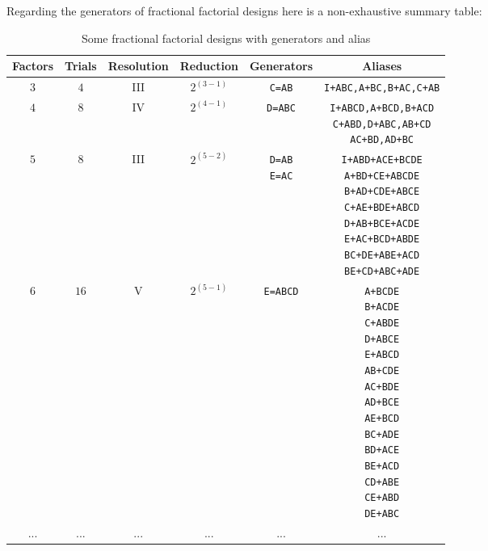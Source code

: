 	Regarding the generators of fractional factorial designs here is a non-exhaustive summary table:
	\begin{table}[H]\centering
	\begin{center}
			\begin{tabular}{|c|c|c|c|c|c|}
				\hline
				\multicolumn{1}{c}{\cellcolor{black!30}\textbf{Factors}} & 
  \multicolumn{1}{c}{\cellcolor{black!30}\textbf{Trials}} & 
  \multicolumn{1}{c}{\cellcolor{black!30}\textbf{Resolution}} & 
  \multicolumn{1}{c}{\cellcolor{black!30}\textbf{Reduction}} & 
  \multicolumn{1}{c}{\cellcolor{black!30}\textbf{Generators}} & 
  \multicolumn{1}{c}{\cellcolor{black!30}\textbf{Aliases}}\\ \hline
				 $3$ & $4$ & III & $2^{(3-1)}$ & \texttt{C=AB} & \parbox{4.5cm}{\texttt{I+ABC,A+BC,B+AC,C+AB}} \\ \hline
				 $4$ & $8$ & IV & $2^{(4-1)}$ & \texttt{D=ABC} & \parbox{4.5cm}{\texttt{I+ABCD,A+BCD,B+ACD}\\\texttt{C+ABD,D+ABC,AB+CD}\\\texttt{AC+BD,AD+BC}} \\ \hline
				 $5$ & $8$ & III & $2^{(5-2)}$ & \parbox{2cm}{\texttt{D=AB}\\\texttt{E=AC}} & \parbox{4.5cm}{\texttt{I+ABD+ACE+BCDE}\\\texttt{A+BD+CE+ABCDE}\\\texttt{B+AD+CDE+ABCE}\\\texttt{C+AE+BDE+ABCD}\\\texttt{D+AB+BCE+ACDE}\\\texttt{E+AC+BCD+ABDE}\\\texttt{BC+DE+ABE+ACD}\\\texttt{BE+CD+ABC+ADE}} \\ \hline
				 $6$ & $16$ & V & $2^{(5-1)}$ & \parbox{2cm}{\texttt{E=ABCD}} & \parbox{4.5cm}{\texttt{A+BCDE}\\\texttt{B+ACDE}\\\texttt{C+ABDE}\\\texttt{D+ABCE}\\\texttt{E+ABCD}\\\texttt{AB+CDE}\\\texttt{AC+BDE}\\\texttt{AD+BCE}\\\texttt{AE+BCD}\\\texttt{BC+ADE}\\\texttt{BD+ACE}\\\texttt{BE+ACD}\\\texttt{CD+ABE}\\\texttt{CE+ABD}\\\texttt{DE+ABC}} \\ \hline
				... & ... & ... & ... & ... & ... \\ \hline
 		\end{tabular}
	\end{center}
	\caption{Some fractional factorial designs with generators and alias}
	\end{table}
